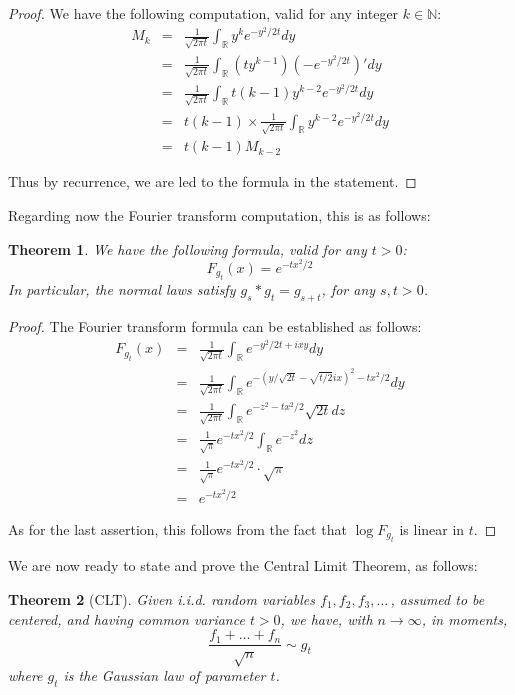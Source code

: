 \documentclass[12pt]{amsbook}
\newtheorem{theorem}{Theorem}[chapter]
\begin{document}
\begin{proof}
We have the following computation, valid for any integer $k\in\mathbb N$:
\begin{eqnarray*}
M_k
&=&\frac{1}{\sqrt{2\pi t}}\int_\mathbb Ry^ke^{-y^2/2t}dy\\
&=&\frac{1}{\sqrt{2\pi t}}\int_\mathbb R(ty^{k-1})\left(-e^{-y^2/2t}\right)'dy\\
&=&\frac{1}{\sqrt{2\pi t}}\int_\mathbb Rt(k-1)y^{k-2}e^{-y^2/2t}dy\\
&=&t(k-1)\times\frac{1}{\sqrt{2\pi t}}\int_\mathbb Ry^{k-2}e^{-y^2/2t}dy\\
&=&t(k-1)M_{k-2}
\end{eqnarray*}

Thus by recurrence, we are led to the formula in the statement.
\end{proof}

Regarding now the Fourier transform computation, this is as follows:

\begin{theorem}
We have the following formula, valid for any $t>0$:
$$F_{g_t}(x)=e^{-tx^2/2}$$
In particular, the normal laws satisfy $g_s*g_t=g_{s+t}$, for any $s,t>0$.
\end{theorem}

\begin{proof}
The Fourier transform formula can be established as follows:
\begin{eqnarray*}
F_{g_t}(x)
&=&\frac{1}{\sqrt{2\pi t}}\int_\mathbb Re^{-y^2/2t+ixy}dy\\
&=&\frac{1}{\sqrt{2\pi t}}\int_\mathbb Re^{-(y/\sqrt{2t}-\sqrt{t/2}ix)^2-tx^2/2}dy\\
&=&\frac{1}{\sqrt{2\pi t}}\int_\mathbb Re^{-z^2-tx^2/2}\sqrt{2t}dz\\
&=&\frac{1}{\sqrt{\pi}}e^{-tx^2/2}\int_\mathbb Re^{-z^2}dz\\
&=&\frac{1}{\sqrt{\pi}}e^{-tx^2/2}\cdot\sqrt{\pi}\\
&=&e^{-tx^2/2}
\end{eqnarray*}

As for the last assertion, this follows from the fact that $\log F_{g_t}$ is linear in $t$.
\end{proof}

We are now ready to state and prove the Central Limit Theorem, as follows:


\begin{theorem}[CLT]
Given i.i.d. random variables $f_1,f_2,f_3,\ldots\,$, assumed to be centered, and having common variance $t>0$, we have, with $n\to\infty$, in moments,
$$\frac{f_1+\ldots+f_n}{\sqrt{n}}\sim g_t$$
where $g_t$ is the Gaussian law of parameter $t$.
\end{theorem}
\end{document}
